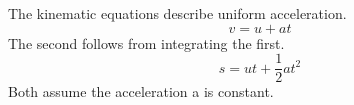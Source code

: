 \documentclass{article}
\begin{document}
The kinematic equations describe uniform acceleration.
\[ v = u + at \]
The second follows from integrating the first.
\[ s = ut + \frac{1}{2}at^2 \]
Both assume the acceleration a is constant.
\end{document}
